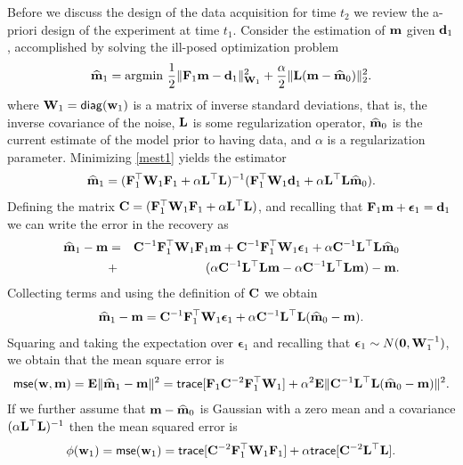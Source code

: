 \documentclass[11pt]{article}
\newcommand{\bfC}	{{\bf{C}}}
\newcommand{\bfE}	{{\bf{E}}}
\newcommand{\bfF}	{{\bf{F}}}
\newcommand{\bfL}	{{\bf{L}}}
\newcommand{\bfW}	{{\bf{W}}}
\newcommand{\bfd}	{{\bf{d}}}
\newcommand{\bfm}	{{\bf{m}}}
\newcommand{\bfw}	{{\bf{w}}}
\newcommand{\hf}        {{\frac 12}}
\newcommand{\bfepsilon} {{\boldsymbol \epsilon}}
\newcommand{\LtL}       { \bfL^{\top}\bfL}
\newcommand {\zero}  { {\bf 0} }
\renewcommand{\hf}		 {\frac12}
\newcommand{\bfmhat}    {{\widehat{\bfm}}}
\begin{document}
Before we discuss the design of the data acquisition for time $t_{2}$
 we review the a-priori design of the experiment at time $t_{1}$.  
Consider  the estimation of $\bfm$ given $\bfd_{1}$,  accomplished by solving the ill-posed optimization problem
\begin{eqnarray}
\label{mest1}
\widehat \bfm_{1} = {\rm arg}{\min} \ \hf \| \bfF_{1} \bfm - \bfd_{1}\|^{2}_{\bfW_{1}} + {\frac {\alpha} 2}
\|\bfL (\bfm - \bfmhat_{0}) \|^{2}_2. 
\end{eqnarray}
where $\bfW_{1} = {\sf diag}(\bfw_{1})$ is a matrix of inverse standard deviations, 
that is, the inverse covariance of the noise, $\bfL$ is some regularization operator, $\bfmhat_{0}$ is
the current estimate of the model prior to having data, and $\alpha$ is a regularization parameter.
Minimizing \eqref{mest1} yields the estimator
\begin{eqnarray}
\label{mest}
\widehat \bfm_{1} = (\bfF_{1}^{\top} \bfW_{1}\bfF_{1} + \alpha \LtL)^{-1} (\bfF_{1}^{\top} \bfW_{1} \bfd_{1}
+ \alpha \LtL \bfmhat_{0}).
\end{eqnarray}
Defining the matrix $\bfC = (\bfF_{1}^{\top} \bfW_{1}\bfF_{1} + \alpha \LtL)$, and recalling that $\bfF_1\bfm + \bfepsilon_1 = \bfd_1$ we can write
the error in the recovery as
\begin{eqnarray}
\bfmhat_1 -\bfm &=& \bfC^{-1} \bfF_{1}^{\top} \bfW_{1}\bfF_{1} \bfm + \bfC^{-1} \bfF_{1}^{\top} \bfW_{1}\bfepsilon_1 + \alpha
\bfC^{-1} \LtL \bfmhat_{0} \\
\nonumber
&+& (\alpha \bfC^{-1} \LtL\bfm
- \alpha \bfC^{-1} \LtL \bfm) 
 -\bfm.
\end{eqnarray}
Collecting terms and using the definition of $\bfC$ we obtain
\begin{eqnarray}
\label{diffmod}
\bfmhat_1 -\bfm = \bfC^{-1} \bfF_{1}^{\top} \bfW_{1} \bfepsilon_1 + \alpha \bfC^{-1} \LtL (\bfmhat_{0} - \bfm).
\end{eqnarray}
Squaring and taking the expectation over $\bfepsilon_1$ and recalling that $ \bfepsilon_1 \sim N(\zero,\bfW_{1}^{-1})$, we obtain that the mean square error is
\begin{eqnarray}
{\sf mse}(\bfw,\bfm) = \bfE\| \bfmhat_1 -\bfm \|^{2} = {\sf trace}[   \bfF_{1} \bfC^{-2} \bfF_{1}^{\top} \bfW_{1}]  + 
\alpha^2 \bfE\| \bfC^{-1} \LtL (\bfmhat_{0} - \bfm) \|^{2}.
\end{eqnarray}
If we further assume that $\bfm-\bfmhat_{0}$ is Gaussian with a zero mean and a covariance
$(\alpha \LtL)^{-1}$ then the mean squared error is 
\begin{eqnarray}
\phi(\bfw_1 ) = {\sf mse}(\bfw_1) = {\sf trace}[    \bfC^{-2} \bfF_{1}^{\top}\bfW_{1}\bfF_{1}]  + 
 \alpha {\sf trace} [\bfC^{-2} \LtL]. 
\end{eqnarray}
\end{document}
